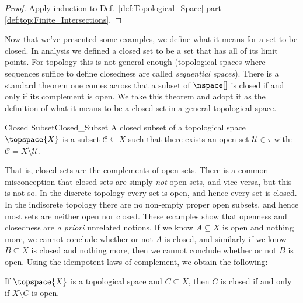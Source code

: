 \documentclass[oneside]{book}                                                  %
\begin{document}
                \begin{proof}
                    Apply induction to Def.~\ref{def:Topological_Space}
                    part \ref{def:top:Finite_Intersections}.
                \end{proof}
                Now that we've presented some examples, we define what it means
                for a set to be closed. In analysis we defined a closed set to
                be a set that has all of its limit points. For topology this is
                not general enough (topological spaces where sequences suffice
                to define closedness are called \textit{sequential spaces}).
                There is a standard theorem one comes across that a subset of
                $\nspace[]$ is closed if and only if its complement is open. We
                take this theorem and adopt it as the definition of what it
                means to be a closed set in a general topological space.
                \begin{fdefinition}{Closed Subset}{Closed_Subset}
                    A closed subset of a topological space $\topspace{X}$ is a
                    subset $\mathcal{C}\subseteq{X}$ such that there exists an
                    open set $\mathcal{U}\in\tau$ with:
                    $\mathcal{C}=X\setminus\mathcal{U}$.
                \end{fdefinition}
                That is, closed sets are the complements of open sets. There is
                a common misconception that closed sets are simply \textit{not}
                open sets, and vice-versa, but this is not so. In the discrete
                topology every set is open, and hence every set is closed. In
                the indiscrete topology there are no non-empty proper open
                subsets, and hence most sets are neither open nor closed. These
                examples show that openness and closedness are
                \textit{a priori} unrelated notions. If we know $A\subseteq{X}$
                is open and nothing more, we cannot conclude whether or not $A$
                is closed, and similarly if we know $B\subseteq{X}$ is closed
                and nothing more, then we cannot conclude whether or not $B$ is
                open. Using the idempotent laws of complement, we obtain the
                following:
                \begin{theorem}
                    \label{thm:Closed_Iff_Comp_is_Open}%
                    If $\topspace{X}$ is a topological space and
                    $C\subseteq{X}$, then $C$ is closed if and only if
                    $X\setminus{C}$ is open.
                \end{theorem}
\end{document}
